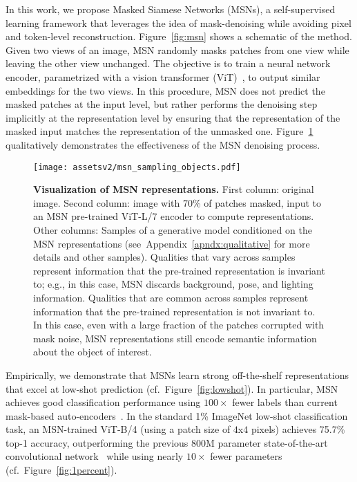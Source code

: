 \documentclass{article}
\begin{document}
In this work, we propose Masked Siamese Networks (MSNs), a self-supervised learning framework that leverages the idea of mask-denoising while avoiding pixel and token-level reconstruction.
Figure~\ref{fig:msn} shows a schematic of the method.
Given two views of an image, MSN randomly masks patches from one view while leaving the other view unchanged.
The objective is to train a neural network encoder, parametrized with a vision transformer (ViT)~\citep{dosovitskiy2020image}, to output similar embeddings for the two views.
In this procedure, MSN does not predict the masked patches at the input level, but rather performs the denoising step implicitly at the representation level by ensuring that the representation of the masked input matches the representation of the unmasked one.
Figure~\ref{fig:msn_sampling} qualitatively demonstrates the effectiveness of the MSN denoising process. \begin{figure}[h]
    \centering
    \texttt{[image: assetsv2/msn\_sampling\_objects.pdf]}
    \caption{{\bf Visualization of MSN representations.} First column: original image. Second column: image with 70\% of patches masked, input to an MSN pre-trained ViT-L/7 encoder to compute representations. Other columns: Samples of a generative model conditioned on the MSN representations (see~Appendix~\ref{apndx:qualitative} for more details and other samples). Qualities that vary across samples represent information that the pre-trained representation is invariant to; e.g., in this case, MSN discards background, pose, and lighting information. Qualities that are common across samples represent information that the pre-trained representation is not invariant to. In this case, even with a large fraction of the patches corrupted with mask noise, MSN representations still encode semantic information about the object of interest.}
    \label{fig:msn_sampling}
\end{figure}

Empirically, we demonstrate that MSNs learn strong off-the-shelf representations that excel at low-shot prediction (cf.~Figure~\ref{fig:lowshot}).
In particular, MSN achieves good classification performance using $100\times$ fewer labels than current mask-based auto-encoders~\citep{he2021masked,xie2019unsupervised}.
In the standard 1\% ImageNet low-shot classification task, an MSN-trained ViT-B/4 (using a patch size of $4$x$4$ pixels) achieves 75.7\% top-1 accuracy, outperforming the previous 800M parameter state-of-the-art convolutional network~\citep{chen2020big} while using nearly $10\times$ fewer parameters (cf.~Figure~\ref{fig:1percent}).
\end{document}
